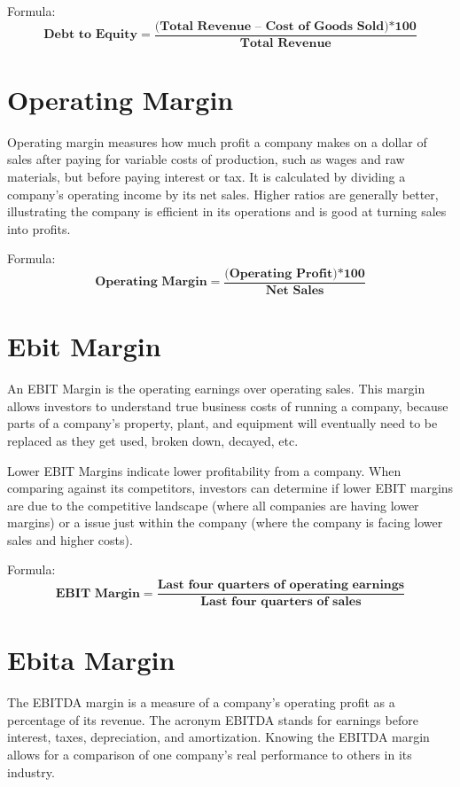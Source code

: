 \documentclass{article}
\begin{document}
\bigskip
Formula:
$$
\textbf{Debt to Equity} =  \frac{\textbf{(Total Revenue – Cost of Goods Sold)*100}}{\textbf{Total Revenue}}
$$

\section{Operating Margin}
\label{sec:OM}
Operating margin measures how much profit a company makes on a dollar of sales after paying for variable costs of production, such as wages and raw materials, but before paying interest or tax. It is calculated by dividing a company’s operating income by its net sales. Higher ratios are generally better, illustrating the company is efficient in its operations and is good at turning sales into profits.

\bigskip
Formula:
$$
\textbf{Operating Margin} =  \frac{\textbf{(Operating Profit)*100}}{\textbf{Net Sales}}
$$

\section{Ebit Margin}
\label{sec:em}
An EBIT Margin is the operating earnings over operating sales. This margin allows investors to understand true business costs of running a company, because parts of a company's property, plant, and equipment will eventually need to be replaced as they get used, broken down, decayed, etc.
\par
\bigskip
Lower EBIT Margins indicate lower profitability from a company. When comparing against its competitors, investors can determine if lower EBIT margins are due to the competitive landscape (where all companies are having lower margins) or a issue just within the company (where the company is facing lower sales and higher costs).
\bigskip

Formula:
$$
\textbf{EBIT Margin} =  \frac{\textbf{Last four quarters of operating earnings}}{\textbf{Last four quarters of sales}}
$$

\section{Ebita Margin}
\label{sec:em2}
The EBITDA margin is a measure of a company's operating profit as a percentage of its revenue. The acronym EBITDA stands for earnings before interest, taxes, depreciation, and amortization. Knowing the EBITDA margin allows for a comparison of one company's real performance to others in its industry. 
\par
\bigskip
\end{document}
